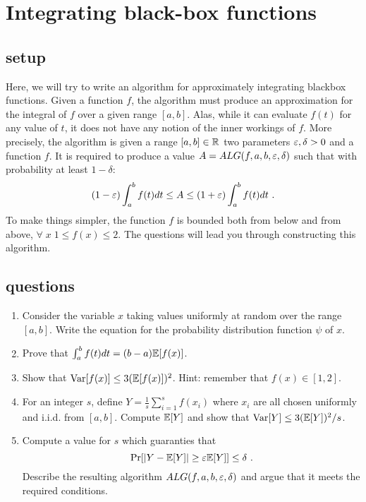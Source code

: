 \documentclass{article}
\begin{document}

\section{Integrating black-box functions}
\subsection*{setup}
Here, we will try to write an algorithm for approximately integrating blackbox functions.
Given a function $f$, the algorithm must produce an approximation for the integral of $f$ over a given range $[a,b]$.
Alas, while it can evaluate $f(t)$ for any value of $t$, it does not have any notion of the inner workings of $f$. 
More precisely, the algorithm is given a range $[a,b] \in {\mathbb{R}}$ two parameters $\varepsilon, \delta > 0$ and a function $f$.
It is required to produce a value $A = ALG(f,a,b,\varepsilon,\delta)$ such that with probability at least $1 -\delta$:
\[
 (1-\varepsilon) \int_{a}^{b} f(t)dt \le A \le  (1+\varepsilon) \int_{a}^{b} f(t)dt \ . 
\]
To make things simpler, the function $f$ is bounded both from below and from above, $\forall \; x \; 1 \le f(x) \le 2$.
The questions will lead you through constructing this algorithm.

\subsection*{questions}
\begin{enumerate}
\item Consider the variable $x$ taking values uniformly at random over the range $[a,b]$.
Write the equation for the probability distribution function $\psi$ of $x$. 
\item Prove that $\int_{a}^{b}f(t)dt = (b-a){\mathbb E}[f(x)]$.
\item Show that ${\operatorname{Var}}[f(x)] \le 3 ({\mathbb E}[f(x)])^2$. Hint: remember that $f(x) \in [1,2]$.
\item For an integer $s$, define $Y = \frac{1}{s}\sum_{i=1}^{s}f(x_i)$ where $x_i$ are all chosen uniformly and i.i.d. from $[a,b]$.
Compute ${\mathbb E}[Y]$ and show that ${\operatorname{Var}}[Y] \le 3 ({\mathbb E}[Y])^2 /s$.
\item Compute a value for $s$ which guaranties that 
\[
\Pr[ |Y -  {\mathbb E}[Y] | \ge \varepsilon {\mathbb E}[Y]] \le \delta \ .
\]
Describe the resulting algorithm $ALG(f,a,b,\varepsilon,\delta)$ and argue that it meets the required conditions.
\end{enumerate}
\pagebreak
\end{document}

